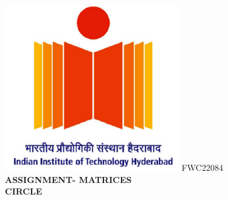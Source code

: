 \documentclass[8pt,a4paper]{report}
\begin{document}
\raggedright{\includegraphics[scale=0.8]{iith.png}} \hspace{12cm}\raggedleft FWC22084\vspace{8mm}\\ 

\centering \Large \textbf{ASSIGNMENT- MATRICES}
\\ \centering \Large \textbf{CIRCLE} \vspace{15mm}
\end{document}
